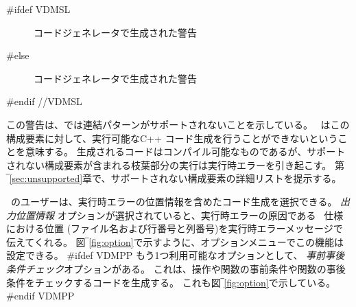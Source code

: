 \documentclass[\pformat,12pt]{jarticle}
\begin{document}
#ifdef VDMSL
\begin{figure}[tbh]
\begin{center}
\mbox{}
\caption{コードジェネレータで生成された警告}\label{fig:cg_error}
\end{center}
\end{figure}
#else
\begin{figure}[tbh]
\begin{center}
\mbox{}
\caption{コードジェネレータで生成された警告}\label{fig:cg_error}
\end{center}
\end{figure}
#endif //VDMSL


この警告は、\tcg{}では連結パターンがサポートされないことを示している。
\tcg\ はこの構成要素に対して、実行可能なC++ コード生成を行うことができないということを意味する。
生成されるコードはコンパイル可能なものであるが、サポートされない構成要素が含まれる枝葉部分の実行は実行時エラーを引き起こす。 
第‾\ref{sec:unsupported}章で、サポートされない構成要素の詳細リストを提示する。

\tcg\ のユーザーは、実行時エラーの位置情報を含めたコード生成を選択できる。
{\em 出力位置情報} オプションが選択されていると、実行時エラーの原因である \VDM\ 仕様における位置 (ファイル名および行番号と列番号)を実行時エラーメッセージで伝えてくれる。
 図‾\ref{fig:option}で示すように、オプションメニューでこの機能は設定できる。
#ifdef VDMPP
もう1つ利用可能なオプションとして、 \textit{事前事後条件チェック}オプションがある。
これは、操作や関数の事前条件や関数の事後条件をチェックするコードを生成する。
これも図‾\ref{fig:option}で示している。
#endif VDMPP
\end{document}
